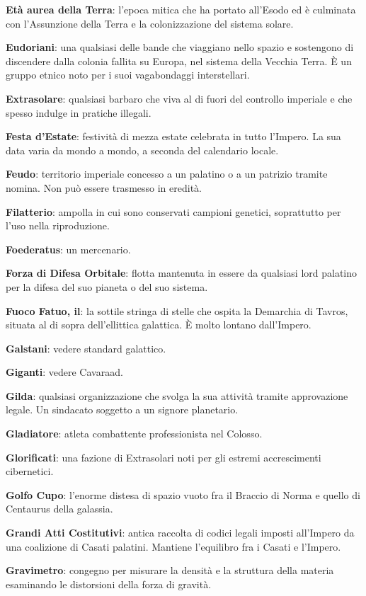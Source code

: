 \textbf{Età aurea della Terra}: l'epoca mitica che ha portato all'Esodo
ed è culminata con l'Assunzione della Terra e la colonizzazione del
sistema solare.

\textbf{Eudoriani}: una qualsiasi delle bande che viaggiano nello spazio
e sostengono di discendere dalla colonia fallita su Europa, nel sistema
della Vecchia Terra. È un gruppo etnico noto per i suoi vagabondaggi
interstellari.

\textbf{Extrasolare}: qualsiasi barbaro che viva al di fuori del
controllo imperiale e che spesso indulge in pratiche illegali.

\textbf{Festa d'Estate}: festività di mezza estate celebrata in tutto
l'Impero. La sua data varia da mondo a mondo, a seconda del calendario
locale.

\textbf{Feudo}: territorio imperiale concesso a un palatino o a un
patrizio tramite nomina. Non può essere trasmesso in eredità.

\textbf{Filatterio}: ampolla in cui sono conservati campioni genetici,
soprattutto per l'uso nella riproduzione.

\textbf{Foederatus}: un mercenario.

\textbf{Forza di Difesa Orbitale}: flotta mantenuta in essere da
qualsiasi lord palatino per la difesa del suo pianeta o del suo sistema.

\textbf{Fuoco Fatuo, il}: la sottile stringa di stelle che ospita la
Demarchia di Tavros, situata al di sopra dell'ellittica galattica. È
molto lontano dall'Impero.

\textbf{Galstani}: vedere standard galattico.

\textbf{Giganti}: vedere Cavaraad.

\textbf{Gilda}: qualsiasi organizzazione che svolga la sua attività
tramite approvazione legale. Un sindacato soggetto a un signore
planetario.

\textbf{Gladiatore}: atleta combattente professionista nel Colosso.

\textbf{Glorificati}: una fazione di Extrasolari noti per gli estremi
accrescimenti cibernetici.

\textbf{Golfo Cupo}: l'enorme distesa di spazio vuoto fra il Braccio di
Norma e quello di Centaurus della galassia.

\textbf{Grandi Atti Costitutivi}: antica raccolta di codici legali
imposti all'Impero da una coalizione di Casati palatini. Mantiene
l'equilibro fra i Casati e l'Impero.

\textbf{Gravimetro}: congegno per misurare la densità e la struttura
della materia esaminando le distorsioni della forza di gravità.

